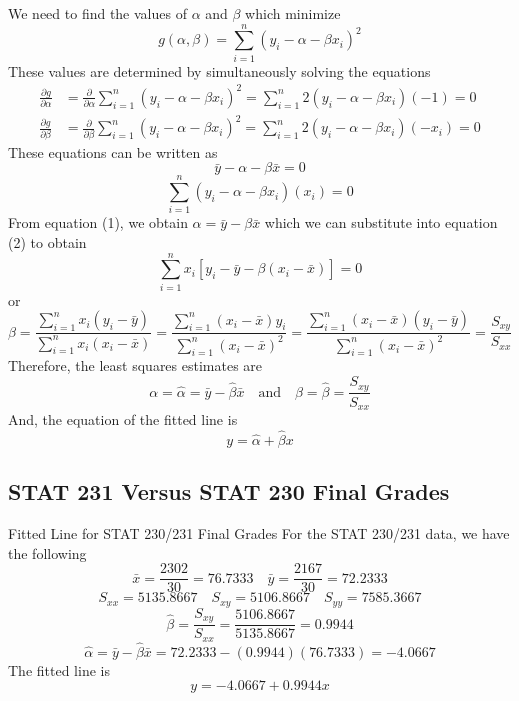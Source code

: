 \documentclass[oneside]{book}
\begin{document}
We need to find the values of $ \alpha $ and $ \beta $ which minimize
\[g(\alpha, \beta)=\sum_{i=1}^{n}\left(y_{i}-\alpha-\beta x_{i}\right)^{2}\]
These values are determined by simultaneously solving the equations
\[
    \begin{aligned}
        \frac{\partial g}{\partial \alpha} & =\frac{\partial}{\partial \alpha} \sum_{i=1}^{n}\left(y_{i}-\alpha-\beta x_{i}\right)^{2}=\sum_{i=1}^{n} 2\left(y_{i}-\alpha-\beta x_{i}\right)(-1)=0               \\
        \frac{\partial g}{\partial \beta}  & =\frac{\partial}{\partial \beta} \sum_{i=1}^{n}\left(y_{i}-\alpha-\beta x_{i}\right)^{2}=\sum_{i=1}^{n} 2\left(y_{i}-\alpha-\beta x_{i}\right)\left(-x_{i}\right)=0
    \end{aligned}
\]
These equations can be written as
\begin{equation}\tag{1}
    \bar{y}-\alpha-\beta \bar{x}=0
\end{equation}
\begin{equation}\tag{2}
    \sum_{i=1}^{n}\left(y_{i}-\alpha-\beta x_{i}\right)\left(x_{i}\right)=0
\end{equation}
From equation (1), we obtain $ \alpha=\bar{y}-\beta \bar{x} $ which
we can substitute into equation (2) to obtain
\[\sum_{i=1}^{n} x_{i}\left[y_{i}-\bar{y}-\beta\left(x_{i}-\bar{x}\right)\right]=0\]
or
\[\beta=
    \frac{\sum\limits_{i=1}^{n} x_{i}\left(y_{i}-\bar{y}\right)}
    {\sum\limits_{i=1}^{n} x_{i}\left(x_{i}-\bar{x}\right)}
    =\frac{\sum\limits_{i=1}^{n}\left(x_{i}-\bar{x}\right) y_{i}}
    {\sum\limits_{i=1}^{n}\left(x_{i}-\bar{x}\right)^{2}}
    =\frac{\sum\limits_{i=1}^{n}\left(x_{i}-\bar{x}\right)\left(y_{i}-\bar{y}\right)}
    {\sum\limits_{i=1}^{n}\left(x_{i}-\bar{x}\right)^{2}}
    =\frac{S_{x y}}{S_{x x}}\]
Therefore, the least squares estimates are
\[\alpha=\hat{\alpha}=\bar{y}-\hat{\beta} \bar{x}
    \quad \text{and} \quad \beta=\hat{\beta}=\frac{S_{x y}}{S_{x x}}\]
And, the equation of the fitted line is
\[y=\hat{\alpha}+\hat{\beta} x\]

\subsection{STAT 231 Versus STAT 230 Final Grades}


\begin{Example}{Fitted Line for STAT 230/231 Final Grades}{}
    For the STAT 230/231 data, we have the following
    \[\bar{x}=\frac{2302}{30}=76.7333 \quad \bar{y}=\frac{2167}{30}=72.2333\]
    \[S_{x x}=5135.8667 \quad S_{x y}=5106.8667 \quad S_{y y}=7585.3667\]
    \[\hat{\beta}=\frac{S_{x y}}{S_{x x}}=\frac{5106.8667}{5135.8667}=0.9944\]
    \[\hat{\alpha}=\bar{y}-\hat{\beta} \bar{x}=72.2333-(0.9944)(76.7333)=-4.0667\]
    The fitted line is
    \[y=-4.0667+0.9944 x\]
\end{Example}
\end{document}
